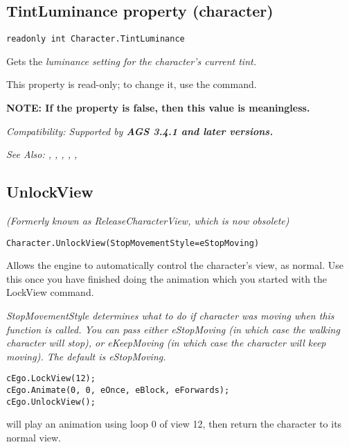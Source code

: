 \subsection{TintLuminance property (character)}\label{Character.TintLuminance}%

\begin{verbatim}
readonly int Character.TintLuminance
\end{verbatim}
Gets the \it{luminance} setting for the character's current tint.

This property is read-only; to change it, use the  command.

\bf{NOTE:} If the  property is false, then
this value is meaningless.

\it{Compatibility:} Supported by \bf{AGS 3.4.1} and later versions.

\it{See Also:} , ,
, ,
, 


\subsection{UnlockView}\label{Character.UnlockView}%

\it{(Formerly known as ReleaseCharacterView, which is now obsolete)}

\begin{verbatim}
Character.UnlockView(StopMovementStyle=eStopMoving)
\end{verbatim}
Allows the engine to automatically control the character's view, as normal.
Use this once you have finished doing the animation which you started with
the LockView command.

\it{StopMovementStyle} determines what to do if character was moving when this function is called. You can pass either eStopMoving (in which case the walking character will stop), or eKeepMoving (in which case the character will keep moving). The default is eStopMoving.

\begin{verbatim}
cEgo.LockView(12);
cEgo.Animate(0, 0, eOnce, eBlock, eForwards);
cEgo.UnlockView();
\end{verbatim}
will play an animation using loop 0 of view 12, then return the character to its normal view.

